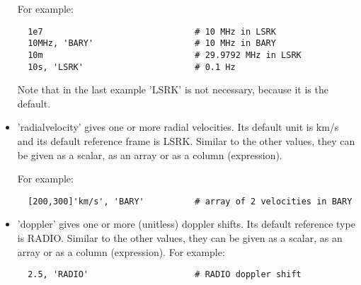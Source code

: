 \begin{itemize}
  For example:
\begin{verbatim}
  1e7                              # 10 MHz in LSRK
  10MHz, 'BARY'                    # 10 MHz in BARY
  10m                              # 29.9792 MHz in LSRK
  10s, 'LSRK'                      # 0.1 Hz
\end{verbatim}
  Note that in the last example 'LSRK' is not necessary, because it is
  the default.

\item 'radialvelocity' gives one or more radial velocities. Its
  default unit is km/s and its default reference frame is LSRK.
  Similar to the other values, they can be given as a scalar, as an
  array or as a column (expression).

  For example:
\begin{verbatim}
  [200,300]'km/s', 'BARY'          # array of 2 velocities in BARY
\end{verbatim}

\item 'doppler' gives one or more (unitless) doppler shifts. Its default
  reference type is RADIO.
  Similar to the other values, they can be given as a scalar, as an
  array or as a column (expression).
  For example:
\begin{verbatim}
  2.5, 'RADIO'                     # RADIO doppler shift 
\end{verbatim}


\end{itemize}


